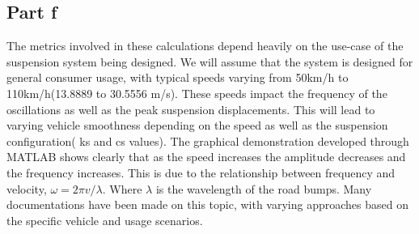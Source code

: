 \documentclass[11pt]{article}
\begin{document}
\subsection{Part f}
\label{sec:org5621049}
The metrics involved in these calculations depend heavily on the use-case of the suspension system being designed. We will assume that the system is designed for general consumer usage, with typical speeds varying from 50km/h to 110km/h(13.8889 to 30.5556 m/s). These speeds impact the frequency of the oscillations as well as the peak suspension displacements. This will lead to varying vehicle smoothness depending on the speed as well as the suspension configuration( ks and cs values). The graphical demonstration developed through MATLAB shows clearly that as the speed increases the amplitude decreases and the frequency increases. This is due to the relationship between frequency and velocity, \(\omega =2\pi v/\lambda\). Where \(\lambda\) is the wavelength of the road bumps. Many documentations have been made on this topic, with varying approaches based on the specific vehicle and usage scenarios.
\cite{collimator2024}
\cite{Optimization_of_vehicle_suspension_parameters_with_use_of_evolutionary_computation}
\newpage
\printbibliography
\newpage
\end{document}
